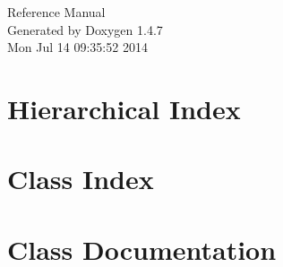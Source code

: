 \documentclass[a4paper]{book}
\begin{document}
\begin{titlepage}
\vspace*{7cm}
\begin{center}
{\Large Reference Manual}\\
\vspace*{1cm}
{\large Generated by Doxygen 1.4.7}\\
\vspace*{0.5cm}
{\small Mon Jul 14 09:35:52 2014}\\
\end{center}
\end{titlepage}
\clearemptydoublepage
{}
\tableofcontents
\clearemptydoublepage
{}
\chapter{Hierarchical Index}

\chapter{Class Index}

\chapter{Class Documentation}































\printindex
\end{document}
